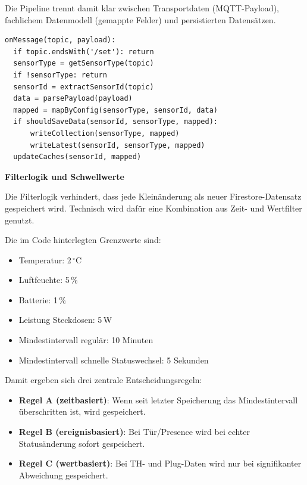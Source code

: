 Die Pipeline trennt damit klar zwischen Transportdaten (MQTT-Payload), fachlichem Datenmodell (gemappte Felder) und persistierten Datensätzen.

\begin{lstlisting}[caption={Schematischer Verarbeitungsfluss im mqttListener},label={lst:mqttlistener_pipeline},basicstyle=\ttfamily\small]
onMessage(topic, payload):
  if topic.endsWith('/set'): return
  sensorType = getSensorType(topic)
  if !sensorType: return
  sensorId = extractSensorId(topic)
  data = parsePayload(payload)
  mapped = mapByConfig(sensorType, sensorId, data)
  if shouldSaveData(sensorId, sensorType, mapped):
      writeCollection(sensorType, mapped)
      writeLatest(sensorId, sensorType, mapped)
  updateCaches(sensorId, mapped)
\end{lstlisting}

\textbf{Filterlogik und Schwellwerte}

Die Filterlogik verhindert, dass jede Kleinänderung als neuer Firestore-Datensatz gespeichert wird. Technisch wird dafür eine Kombination aus Zeit- und Wertfilter genutzt.

Die im Code hinterlegten Grenzwerte sind:

\begin{itemize}
    \item Temperatur: 2\,$^{\circ}$C
    \item Luftfeuchte: 5\,\%
    \item Batterie: 1\,\%
    \item Leistung Steckdosen: 5\,W
    \item Mindestintervall regulär: 10 Minuten
    \item Mindestintervall schnelle Statuswechsel: 5 Sekunden
\end{itemize}

Damit ergeben sich drei zentrale Entscheidungsregeln:

\begin{itemize}
    \item \textbf{Regel A (zeitbasiert)}: Wenn seit letzter Speicherung das Mindestintervall überschritten ist, wird gespeichert.
    \item \textbf{Regel B (ereignisbasiert)}: Bei Tür/Presence wird bei echter Statusänderung sofort gespeichert.
    \item \textbf{Regel C (wertbasiert)}: Bei TH- und Plug-Daten wird nur bei signifikanter Abweichung gespeichert.
\end{itemize}

